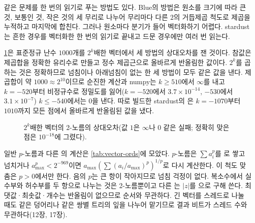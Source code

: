 같은 문제를 한 번의 읽기로 푸는 방법도 있다. Blue의 방법\cite{blue1978}은 원소를 크기에 따라 큰 것, 보통인 것, 작은 것의 세 무리로 나누어 무리마다 다른 $2$의 거듭제곱 척도로 제곱을 누적하고 마지막에 합친다. 그러나 원소마다 분기가 들어 벡터화하기 어렵다. stardust는 흔한 경우를 벡터화한 한 번의 읽기로 끝내고 드문 경우에만 여러 번 읽는다.

\cref{fig:norm-scale}은 표준정규 난수 $1000$개를 $2^k$배한 벡터에서 세 방법의 상대오차를 잰 것이다. 참값은 제곱합을 정확한 유리수로 만들고 정수 제곱근으로 올바르게 반올림한 값이다. $2^k$를 곱하는 것은 정확하므로 넘침이나 아래넘침이 없는 한 세 방법이 모두 같은 값을 낸다. 제곱합이 약 $1000\approx2^{10}$이므로 순진한 계산과 numpy는 $k\ge510$에서 $\infty$를 내고 $k=-520$부터 비정규수로 정밀도를 잃어($k=-520$에서 $3.7\times10^{-14}$, $-530$에서 $3.1\times10^{-7}$) $k\le-540$에서는 $0$을 낸다. 따로 빌드한 stardust의 은 $k=-1070$부터 $1010$까지 모든 점에서 올바르게 반올림된 값을 냈다.

\begin{figure}[htbp]
\centering
{}
\caption{$2^k$배한 벡터의 2-노름의 상대오차(값 $1$은 $\infty$나 $0$ 같은 실패; 정확히 맞은 점은 $10^{-18}$에 그렸다).}
\label{fig:norm-scale}
\end{figure}

일반 $p$-노름과 다른 의 계산은 \cref{tab:vector-ords}에 모았다. $p$-노름은 $\sum a_i^p$를 로 쌓고 넘치거나 $a_{\max}^p<2^{-969}$이면 $a_{\max}(\sum(a_i/a_{\max})^p)^{1/p}$로 다시 계산한다. 이 척도 맞춤은 $p>0$에서만 한다. 음의 $p$는 큰 항이 작아지므로 넘침 걱정이 없다. 복소수에서 실수부와 허수부를 두 항으로 나누는 것은 2-노름뿐이고 다른 는 $|z|$를 으로 구해 쓴다. 최댓값·최솟값·개수는 반올림이 없으므로 순서와 무관하다. 긴 벡터를 스레드로 나눌 때도 같은 덩어리나 같은 쌍별 트리의 잎을 나누어 맡기므로 결과 비트가 스레드 수와 무관하다(12장, 17장).

